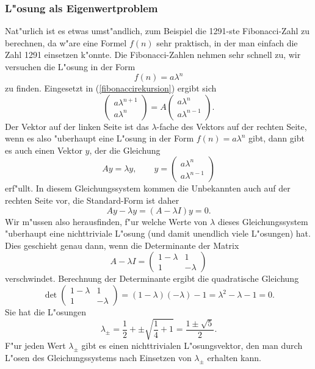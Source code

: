 \subsubsection{L"osung als Eigenwertproblem}
Nat"urlich ist es etwas umst"andlich, zum Beispiel die 1291-ste Fibonacci-Zahl
zu berechnen, da w"are eine Formel $f(n)$ sehr praktisch, in der man einfach
die Zahl 1291 einsetzen k"onnte.
Die Fibonacci-Zahlen nehmen sehr schnell zu, 
wir versuchen die L"osung in der Form
\[
f(n)=a\lambda^n
\]
zu finden. Eingesetzt in (\ref{fibonaccirekursion}) ergibt sich
\[
\begin{pmatrix}a\lambda^{n+1}\\a\lambda^n\end{pmatrix}
=A\begin{pmatrix}a\lambda^n\\a\lambda^{n-1}\end{pmatrix}.
\]
Der Vektor auf der linken Seite ist das $\lambda$-fache des Vektors
auf der rechten Seite, wenn es also "uberhaupt eine L"osung in der
Form $f(n)=a\lambda^n$ gibt, dann gibt es auch einen Vektor $y$, der
die Gleichung
\begin{equation}
Ay=\lambda y, \qquad y=\begin{pmatrix}
a\lambda^n\\a\lambda^{n-1}
\end{pmatrix}
\end{equation}
erf"ullt. In diesem Gleichungssystem kommen die Unbekannten auch auf
der rechten Seite vor, die Standard-Form ist daher
\[
Ay-\lambda y=(A-\lambda I)y=0.
\]
Wir m"ussen also herausfinden, f"ur welche Werte von $\lambda$ dieses
Gleichungssystem "uberhaupt eine nichttriviale L"osung (und damit unendlich
viele L"osungen) hat.
Dies geschieht genau dann, wenn die Determinante der Matrix
\[
A-\lambda I=\begin{pmatrix}1-\lambda&1\\1&-\lambda\end{pmatrix}
\]
verschwindet.
Berechnung der Determinante ergibt die quadratische Gleichung
\[
\det
\begin{pmatrix}1-\lambda&1\\1&-\lambda\end{pmatrix}
=(1-\lambda)(-\lambda)-1=\lambda^2-\lambda-1=0.
\]
Sie hat die L"osungen
\[
\lambda_{\pm}=\frac12+\pm\sqrt{\frac14+1}=\frac{1\pm\sqrt{5}}2.
\]
F"ur jeden Wert $\lambda_{\pm}$ gibt es einen nichttrivialen
L"osungsvektor, den man durch L"osen des Gleichungssystems nach
Einsetzen von $\lambda_{\pm}$ erhalten kann.

